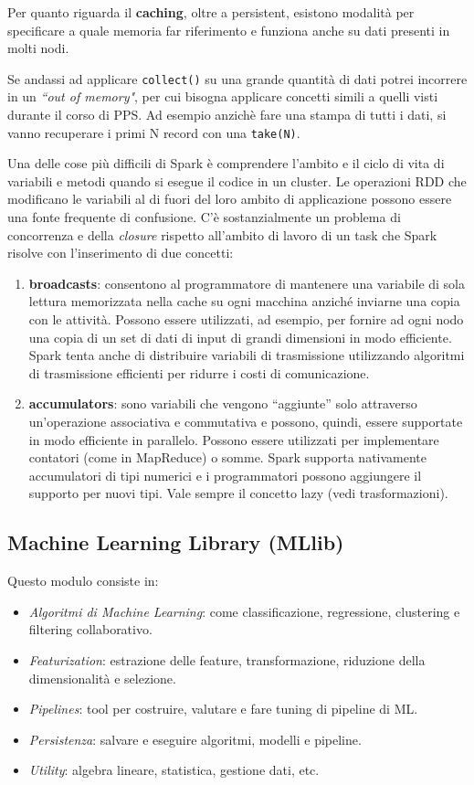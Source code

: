 \documentclass[12pt,italian]{article}
\begin{document}
\par Per quanto riguarda il \textbf{caching}, oltre a persistent, esistono modalità per specificare a quale memoria far riferimento e funziona anche su dati presenti in molti nodi.
\par Se andassi ad applicare \texttt{collect()} su una grande quantità di dati potrei incorrere in un \textit{``out of memory"}, per cui bisogna applicare concetti simili a quelli visti durante il corso di PPS. Ad esempio anzichè fare una stampa di tutti i dati, si vanno recuperare i primi N record con una \texttt{take(N)}.
\par Una delle cose più difficili di Spark è comprendere l'ambito e il ciclo di vita di variabili e metodi quando si esegue il codice in un cluster. Le operazioni RDD che modificano le variabili al di fuori del loro ambito di applicazione possono essere una fonte frequente di confusione. C'è sostanzialmente un problema di concorrenza e della \textit{closure} rispetto all'ambito di lavoro di un task che Spark risolve con l'inserimento di due concetti:
\begin{enumerate}
	\item \textbf{broadcasts}\label{sec:broadcasts}:  consentono al programmatore di mantenere una variabile di sola lettura memorizzata nella cache su ogni macchina anziché inviarne una copia con le attività. Possono essere utilizzati, ad esempio, per fornire ad ogni nodo una copia di un set di dati di input di grandi dimensioni in modo efficiente. Spark tenta anche di distribuire variabili di trasmissione utilizzando algoritmi di trasmissione efficienti per ridurre i costi di comunicazione.
	\item \textbf{accumulators}\label{sec:aoccumulators}: sono variabili che vengono “aggiunte” solo attraverso un'operazione associativa e commutativa e possono, quindi, essere supportate in modo efficiente in parallelo. Possono essere utilizzati per implementare contatori (come in MapReduce) o somme. Spark supporta nativamente accumulatori di tipi numerici e i programmatori possono aggiungere il supporto per nuovi tipi. Vale sempre il concetto lazy (vedi trasformazioni).
\end{enumerate}
\subsection{Machine Learning Library (MLlib)}
Questo modulo consiste in:
\begin{itemize}
	\item \textit{Algoritmi di Machine Learning}: come classificazione, regressione, clustering e filtering collaborativo.
	\item \textit{Featurization}: estrazione delle feature, transformazione, riduzione della dimensionalità e selezione.
	\item \textit{Pipelines}: tool per costruire, valutare e fare tuning di pipeline di ML.
	\item \textit{Persistenza}: salvare e eseguire algoritmi, modelli e pipeline.
	\item \textit{Utility}: algebra lineare, statistica, gestione dati, etc.
\end{itemize}
\end{document}
